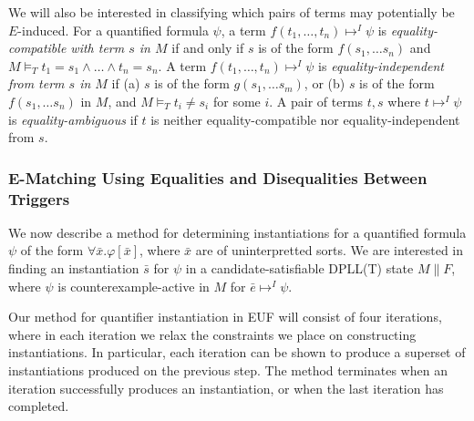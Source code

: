\documentclass{llncs}
\begin{document}
We will also be interested in classifying which pairs of terms may potentially be $E$-induced.
For a quantified formula $\psi$, a term $f( t_1, \ldots, t_n ) \mapsto^I \psi$ is \emph{equality-compatible with term $s$ in $M$} if and only if $s$ is of the form $f( s_1, \ldots s_n )$ and $M \models_T t_1 = s_1 \wedge \ldots \wedge t_n = s_n$.
A term $f( t_1, \ldots, t_n ) \mapsto^I \psi$ is \emph{equality-independent from term $s$ in $M$} if (a) $s$ is of the form $g( s_1, \ldots s_m )$, or (b) $s$ is of the form $f( s_1, \ldots s_n )$ in $M$, and $M \models_T t_i \neq s_i$ for some $i$. 
A pair of terms $t, s$ where $t \mapsto^I \psi$ is \emph{equality-ambiguous} if $t$ is neither equality-compatible nor equality-independent from $s$.

\subsubsection{E-Matching Using Equalities and Disequalities Between Triggers}

We now describe a method for determining instantiations for a quantified formula $\psi$ of the form $\forall \bar{x}. \varphi[\bar{x}]$, where $\bar{x}$ are of uninterpretted sorts.
We are interested in finding an instantiation $\bar{s}$ for $\psi$ in a candidate-satisfiable DPLL(T) state $M \parallel F$, where $\psi$ is counterexample-active in $M$ for $\bar{e} \mapsto^I \psi$.

Our method for quantifier instantiation in EUF will consist of four iterations, where in each iteration we relax the constraints we place on constructing instantiations.
In particular, each iteration can be shown to produce a superset of instantiations produced on the previous step.
The method terminates when an iteration successfully produces an instantiation, or when the last iteration has completed.

\begin{comment}
On the first iteration, we return the instantiation $\varepsilon_M( \bar{e} )$ if and only if $\psi$ is instantiation-ready.
On the second iteration, we determine if there exists a set of terms $\bar{s}$ such that we can determine that at least one of $L_1[\bar{e}] \ldots L_n[\bar{e}]$ is $(\bar{s} = \bar{e})$-induced in $M$.
On the third iteration, we will search for equality-ambiguous pairs of terms $t[\bar{e}]$ and $s$ in the same equivalence classes.  
Specifically, we will construct an instantiation $\bar{s}$ such that an equality between a subterm position of $t[\bar{e}]$ and $s$ is induced by $\bar{s} = \bar{e}$ on this step.
On the fourth iteration, we find a set of terms $\bar{s}$ that induce at least one equality between a pair of terms $t[\bar{e}]$ and $g$.
Note that this step is roughly equivalent to basic E-matching.
\end{comment}
\end{document}
